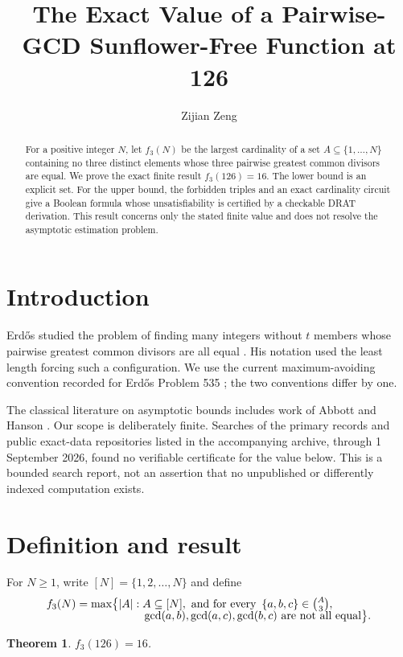 \documentclass[11pt]{amsart}
\title{The Exact Value of a Pairwise-GCD Sunflower-Free Function at 126}
\author{Zijian Zeng}
\date{}
\newtheorem{theorem}{Theorem}[section]
\newcommand{\set}[1]{\left\{#1\right\}}
\begin{document}
\begin{abstract}
For a positive integer $N$, let $f_3(N)$ be the largest cardinality of a set
$A\subseteq\{1,\ldots,N\}$ containing no three distinct elements whose three
pairwise greatest common divisors are equal. We prove the exact finite result
$f_3(126)=16$. The lower bound is an explicit set. For the upper bound, the
forbidden triples and an exact cardinality circuit give a Boolean formula whose
unsatisfiability is certified by a checkable DRAT derivation. This result
concerns only the stated finite value and does not resolve the asymptotic
estimation problem.
\end{abstract}
\maketitle

\section{Introduction}
Erd\H{o}s studied the problem of finding many integers without $t$ members
whose pairwise greatest common divisors are all equal
\cite{Erd_s_1964}. His notation used the least length forcing such a
configuration. We use the current maximum-avoiding convention recorded for
Erd\H{o}s Problem 535 \cite{ErdosProblems535}; the two conventions differ by
one.

The classical literature on asymptotic bounds includes work of Abbott and
Hanson \cite{Abbott_1970}. Our scope is deliberately finite.
Searches of the primary records and public exact-data repositories listed in
the accompanying archive, through 1 September 2026, found no verifiable
certificate for the value below. This is a bounded search report, not an
assertion that no unpublished or differently indexed computation exists.

\section{Definition and result}
For $N\geq1$, write $[N]=\{1,2,\ldots,N\}$ and define
\begin{align*}
 f_3(N)=\max\bigl\{|A|: {}& A\subseteq[N],\text{ and for every }
 \set{a,b,c}\in\tbinom{A}{3},\\[-2mm]
 &\gcd(a,b),\gcd(a,c),\gcd(b,c)\text{ are not all equal}\bigr\}.
\end{align*}

\begin{theorem}\label{thm:main}
$f_3(126)=16$.
\end{theorem}
\end{document}
